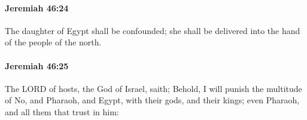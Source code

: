 		\paragraph{Jeremiah 46:24} %
			\label{JEREMIAH-46-24}

			The daughter of Egypt shall be confounded; she shall be delivered into the hand of the people of the north.


		\paragraph{Jeremiah 46:25} %
			\label{JEREMIAH-46-25}

			The LORD of hosts, the God of Israel, saith; Behold, I will punish the multitude of No, and Pharaoh, and Egypt, with their gods, and their kings; even Pharaoh, and all them that trust in him:


